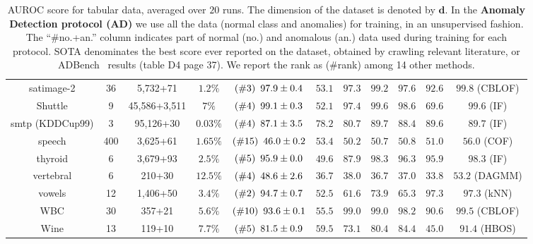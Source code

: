 \begin{table}
{\begin{tabular}{cccc|ccccccc}
    satimage-2 & 36 & 5,732+71 & $1.2\%$ & $(\#3)\hspace{0.5em} 97.9\pm 0.4$ & $53.1$ & $97.3$& $99.2$ & $97.6$ & $92.6$ & $99.8$ (CBLOF)\\
    Shuttle & 9 & 45,586+3,511 & $7\%$ & $(\#4)\hspace{0.5em} 99.1\pm 0.3$ & $52.1$ & $97.4$ & $99.6$ & $98.6$ & $69.6$ & $99.6$ (IF) \\ 
    smtp (KDDCup99) & 3 & 95,126+30 & $0.03\%$ & $(\#4)\hspace{0.5em} 87.1\pm 3.5$ & $78.2$ & $80.7$ & $89.7$ & $88.4$ & $89.6$ & $89.7$ (IF) \\
    speech & 400 & 3,625+61 & $1.65\%$ & $(\#15)\hspace{0.5em} 46.0\pm 0.2$ & $53.4$ & $50.2$ & $50.7$ & $50.8$ & $51.0$ & $56.0$ (COF)\\
    thyroid & 6 & 3,679+93 & $2.5\%$ & $(\#5)\hspace{0.5em} 95.9\pm 0.0$ & $49.6$ & $87.9$ & $98.3$ & $96.3$ & $95.9$ & $98.3$ (IF)\\
    vertebral & 6 & 210+30 & $12.5\%$ &$(\#4)\hspace{0.5em} 48.6\pm 2.6$ & $36.7$ & $38.0$ & $36.7$ & $37.0$ & $33.8$ & $53.2$ (DAGMM)\\
    vowels & 12 & 1,406+50 & $3.4\%$ & $(\#2)\hspace{0.5em} 94.7\pm 0.7$ & $52.5$ & $61.6$ & $73.9$ & $65.3$ & $97.3$ & $97.3$ (kNN)\\
    WBC & 30 & 357+21 & $5.6\%$ & $(\#10)\hspace{0.5em} 93.6\pm 0.1$ & $55.5$ & $99.0$ & $99.0$ & $98.2$ & $90.6$ & $99.5$ (CBLOF) \\ 
    Wine & 13 & 119+10 & $7.7\%$ & $(\#5)\hspace{0.5em} 81.5\pm 0.9$ & $59.5$ & $73.1$ & $80.4$ & $84.4$ & $45.0$ & $91.4$ (HBOS) \\ 
    \end{tabular}}
    \caption{AUROC score for tabular data, averaged over $20$ runs. The dimension of the dataset is denoted by $\bm{d}$. In the \textbf{Anomaly Detection protocol (AD)} we use all the data (normal class and anomalies) for training, in an unsupervised fashion. The ``\#no.+an.'' column indicates part of normal (no.) and anomalous (an.) data used during training for each protocol. SOTA denominates the best score ever reported on the dataset, obtained by crawling relevant literature, or ADBench~\cite{han_adbench_nodate} results (table D4 page 37). We report the rank as (\#rank) among 14 other methods.\\
    }
    \label{tab:tabularrocad}
\end{table}

